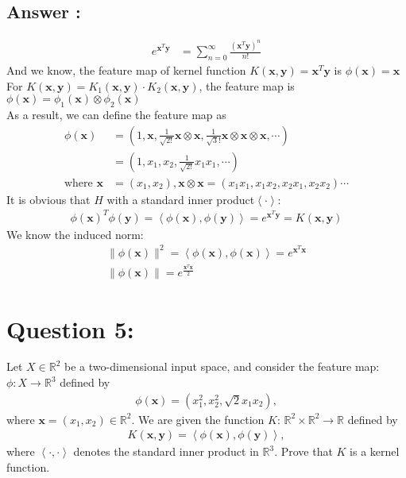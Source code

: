 \documentclass[a4paper,12pt]{article}
\newcommand{\R}{\mathbb{R}}
\begin{document}
\subsection*{Answer :}
\begin{align*}
    e^{\bm{x}^T\bm{y}} &= \sum_{n=0}^{\infty} \frac {(\bm{x}^T\bm{y})^n} {n!}
\end{align*}
And we know, the feature map of kernel function \(K(\bm{x}, \bm{y}) = \bm{x}^T\bm{y}\) is \(\phi(\bm{x}) = \bm{x}\) \\
For \(K(\bm{x}, \bm{y}) = K_1(\bm{x}, \bm{y}) \cdot K_2(\bm{x}, \bm{y})\), the feature map is \(\phi(\bm{x}) = \phi_1(\bm{x}) \otimes \phi_2(\bm{x})\) \\
As a result, we can define the feature map as
\begin{align*}
    \phi(\bm{x}) &= \left( 1, \bm{x}, \frac {1} {\sqrt{2!}} \bm{x} \otimes \bm{x}, \frac {1}{\sqrt 3!}\bm{x} \otimes \bm{x} \otimes \bm{x}, \cdots\right)   \\
    &= (1, x_1, x_2, \frac {1}{\sqrt{2!}} x_1x_1, \cdots) \\
    \text{where } \bm{x} &= (x_1, x_2), \bm{x} \otimes \bm{x} = (x_1x_1, x_1x_2, x_2x_1, x_2x_2) \cdots
\end{align*}
It is obvious that \(H\) with a standard inner product\(\left<\cdot\right>\):
\begin{align*}
    \phi(\bm{x})^T\phi(\bm{y}) = \left<\phi(\bm{x}), \phi(\bm{y})\right> = e^{\bm{x}^T\bm{y}} = K(\bm{x}, \bm{y})
\end{align*}
We know the induced norm:
\begin{align*}
    \|\phi(\bm{x})\|^2 = \left<\phi(\bm{x}), \phi(\bm{x})\right> = e^{\bm{x}^T\bm{x}}   \\
    \|\phi(\bm{x})\| = e^{\frac {\bm{x}^T\bm{x}} 2}
\end{align*}

\section*{Question 5:}
Let \(X \in \R^2\) be a two-dimensional input space, and consider the feature map: \(\phi: X \to \R^3\) defined by
\begin{align*}
    \phi(\bm{x}) = (x_1^2, x_2^2, \sqrt 2 x_1x_2),
\end{align*}
where \(\bm{x} = (x_1, x_2) \in \R^2\). We are given the function \(K\): \(\R^2 \times \R^2 \to \R\) defined by
\begin{align*}
    K(\bm{x}, \bm{y}) = \left< \phi(\bm{x}), \phi(\bm{y})\right>,
\end{align*}
where \(\left<\cdot , \cdot\right>\) denotes the standard inner product in \(\R^3\). Prove that \(K\) is a kernel function.
\end{document}
